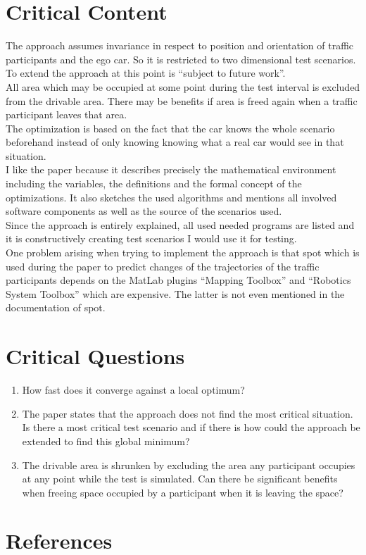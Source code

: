 \documentclass[oneside, notitlepage, twocolumn]{scrartcl}
\begin{document}
\section{Critical Content}
The approach assumes invariance in respect to position and orientation of traffic participants and the ego car.
So it is restricted to two dimensional test scenarios.
To extend the approach at this point is ``subject to future work''.\\
All area which may be occupied at some point during the test interval is excluded from the drivable area.
There may be benefits if area is freed again when a traffic participant leaves that area.\\
The optimization is based on the fact that the car knows the whole scenario beforehand instead of only knowing knowing what a real car would see in that situation.\\
I like the paper because it describes precisely the mathematical environment including the variables, the definitions and the formal concept of the optimizations.
It also sketches the used algorithms and mentions all involved software components as well as the source of the scenarios used.\\
Since the approach is entirely explained, all used needed programs are listed and it is constructively creating test scenarios I would use it for testing.\\
One problem arising when trying to implement the approach is that \gls{spot} which is used during the paper to predict changes of the trajectories of the traffic participants depends on the MatLab plugins ``Mapping Toolbox'' and ``Robotics System Toolbox'' which are expensive.
The latter is not even mentioned in the documentation of \gls{spot}.

\section{Critical Questions}
\begin{enumerate}
    \item How fast does it converge against a local optimum?
    \item The paper states that the approach does not find the most critical situation.
        Is there a most critical test scenario and if there is how could the approach be extended to find this global minimum?
    \item The drivable area is shrunken by excluding the area any participant occupies at any point while the test is simulated.
        Can there be significant benefits when freeing space occupied by a participant when it is leaving the space?
\end{enumerate}

\section{References}
\begingroup
\renewcommand{\section}[2]{}%
\nocite{*}
\printbibliography%
\endgroup
\end{document}

